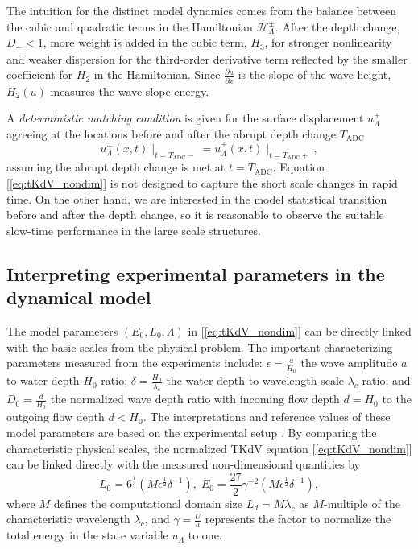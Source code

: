 \documentclass[9pt,twocolumn,twoside,lineno]{pnas-new}
\begin{document}
The intuition for the distinct model dynamics comes from the balance
between the cubic and quadratic terms in the Hamiltonian $\mathcal{H}_{\Lambda}^{\pm}$.
After the depth change, $D_{+}<1$, more weight is added in the cubic
term, $H_{3}$, for stronger nonlinearity and weaker dispersion for
the third-order derivative term reflected by the smaller coefficient
for $H_{2}$ in the Hamiltonian. Since $\frac{\partial u}{\partial x}$
is the slope of the wave height, $H_{2}\left(u\right)$ measures the
wave slope energy.

A \emph{deterministic matching condition} is given for the surface
displacement $u_{\Lambda}^{\pm}$ agreeing at the locations before
and after the abrupt depth change $T_{\mathrm{ADC}}$
\[
u_{\Lambda}^{-}\left(x,t\right)\mid_{t=T_{\mathrm{ADC}}-}=u_{\Lambda}^{+}\left(x,t\right)\mid_{t=T_{\mathrm{ADC}}+},
\]
assuming the abrupt depth change is met at $t=T_{\mathrm{ADC}}$.
Equation [\ref{eq:tKdV_nondim}] is not designed to capture the short
scale changes in rapid time. On the other hand, we are interested
in the model statistical transition before and after the depth change,
so it is reasonable to observe the suitable slow-time performance
in the large scale structures.

\subsection{Interpreting experimental parameters in the dynamical model}

The model parameters $\left(E_{0},L_{0},\Lambda\right)$ in [\ref{eq:tKdV_nondim}]
can be directly linked with the basic scales from the physical problem.
The important characterizing parameters measured from the experiments
include: $\epsilon=\frac{a}{H_{0}}$ the wave amplitude $a$ to water
depth $H_{0}$ ratio; $\delta=\frac{H_{0}}{\lambda_{c}}$ the water
depth to wavelength scale $\lambda_{c}$ ratio; and $D_{0}=\frac{d}{H_{0}}$
the normalized wave depth ratio with incoming flow depth $d=H_{0}$
to the outgoing flow depth $d<H_{0}$. The interpretations and reference
values of these model parameters are based on the experimental setup
\cite{bolles2018anomalous}. By comparing the characteristic physical
scales, the normalized TKdV equation [\ref{eq:tKdV_nondim}] can be
linked directly with the measured non-dimensional quantities by
\begin{equation}
L_{0}=6^{\frac{1}{3}}\left(M\epsilon^{\frac{1}{2}}\delta^{-1}\right),\;E_{0}=\frac{27}{2}\gamma^{-2}\left(M\epsilon^{\frac{1}{2}}\delta^{-1}\right),\label{eq:params}
\end{equation}
where $M$ defines the computational domain size $L_{d}=M\lambda_{c}$
as $M$-multiple of the characteristic wavelength $\lambda_{c}$,
and $\gamma=\frac{U}{a}$ represents the factor to normalize the total
energy in the state variable $u_{\Lambda}$ to one. 
\end{document}
